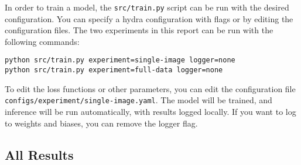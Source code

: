 In order to train a model, the \texttt{src/train.py} script can be run with the desired configuration. You can specify a hydra configuration with flags or by editing the configuration files. The two experiments in this report can be run with the following commands:

\begin{verbatim}
python src/train.py experiment=single-image logger=none
python src/train.py experiment=full-data logger=none
\end{verbatim}

To edit the loss functions or other parameters, you can edit the configuration file \texttt{configs/experiment/single-image.yaml}. The model will be trained, and inference will be run automatically, with results logged locally. If you want to log  to weights and biases, you can remove the logger flag.

\newpage
\subsection{All Results}
\label{sec:all-results}

